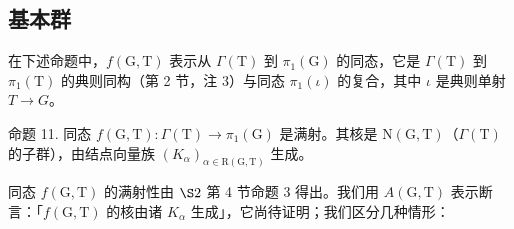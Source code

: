 \subsection{基本群}

在下述命题中，\(f(\mathrm{G},\mathrm{T})\) 表示从 \(\varGamma(\mathrm{T})\) 到 \(\pi_{1}(\mathrm{G})\) 的同态，它是 \(\varGamma(\mathrm{T})\) 到 \(\pi_{1}(\mathrm{T})\) 的典则同构（第 2 节，注 3）与同态 \(\pi_{1}(\iota)\) 的复合，其中 \(\iota\) 是典则单射 \(T\to G\)。

命题 11. 同态 \(f(\mathrm{G},\mathrm{T}) : \Gamma(\mathrm{T}) \to \pi_1(\mathrm{G})\) 是满射。其核是 \(\mathrm{N}(\mathrm{G},\mathrm{T})\)（\(\Gamma(\mathrm{T})\) 的子群），由结点向量族 \((K_{\alpha})_{\alpha \in \mathrm{R}(\mathrm{G},\mathrm{T})}\) 生成。

同态 \(f(\mathrm{G},\mathrm{T})\) 的满射性由 \(\S2\) 第 4 节命题 3 得出。我们用 \(A(\mathrm{G},\mathrm{T})\) 表示断言：「\(f(\mathrm{G},\mathrm{T})\) 的核由诸 \(K_{\alpha}\) 生成」，它尚待证明；我们区分几种情形：


